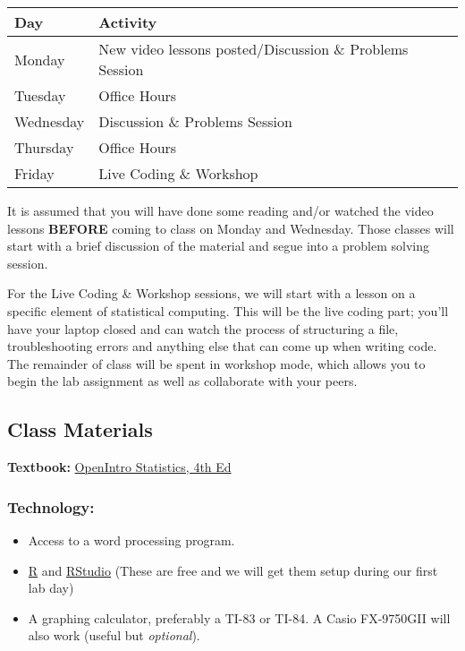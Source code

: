 \documentclass[
]{book}
\providecommand{\tightlist}{%
  \setlength{\itemsep}{0pt}\setlength{\parskip}{0pt}}
\begin{document}
\begin{tabular}{l|l}
\hline
Day & Activity\\
\hline
Monday & New video lessons posted/Discussion \& Problems Session\\
\hline
Tuesday & Office Hours\\
\hline
Wednesday & Discussion \& Problems Session\\
\hline
Thursday & Office Hours\\
\hline
Friday & Live Coding \& Workshop\\
\hline
\end{tabular}

It is assumed that you will have done some reading and/or watched the video lessons \textbf{BEFORE} coming to class on Monday and Wednesday. Those classes will start with a brief discussion of the material and segue into a problem solving session.

For the Live Coding \& Workshop sessions, we will start with a lesson on a specific element of statistical computing. This will be the live coding part; you'll have your laptop closed and can watch the process of structuring a file, troubleshooting errors and anything else that can come up when writing code. The remainder of class will be spent in workshop mode, which allows you to begin the lab assignment as well as collaborate with your peers.

\hypertarget{class-materials}{%
\subsection{Class Materials}\label{class-materials}}

\textbf{Textbook:} \href{https://leanpub.com/openintro-statistics}{OpenIntro Statistics, 4th Ed}

\hypertarget{technology}{%
\subsubsection{Technology:}\label{technology}}

\begin{itemize}
\tightlist
\item
  Access to a word processing program.
\item
  \href{https://cran.r-project.org/}{R} and \href{https://rstudio.com/}{RStudio} (These are free and we will get them setup during our first lab day)
\item
  A graphing calculator, preferably a TI-83 or TI-84. A Casio FX-9750GII will also work (useful but \emph{optional}).
\end{itemize}
\end{document}
